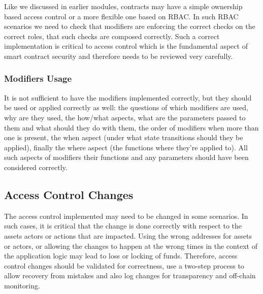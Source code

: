 Like we discussed in earlier modules, contracts may have a simple
ownership based access control or a more flexible one based on RBAC. In
such RBAC scenarios we need to check that modifiers are enforcing the
correct checks on the correct roles, that such checks are composed
correctly. Such a correct implementation is critical to access control
which is the fundamental aspect of smart contract security and therefore
needs to be reviewed very carefully.

\subsubsection{Modifiers Usage}\label{modifiers-usage}

It is not sufficient to have the modifiers implemented correctly, but
they should be used or applied correctly as well: the questions of which
modifiers are used, why are they used, the how/what aspects, what are
the parameters passed to them and what should they do with them, the
order of modifiers when more than one is present, the when aspect (under
what state transitions should they be applied), finally the where aspect
(the functions where they're applied to). All such aspects of modifiers
their functions and any parameters should have been considered
correctly.

\subsection{Access Control Changes}\label{access-control-changes}

The access control implemented may need to be changed in some scenarios.
In such cases, it is critical that the change is done correctly with
respect to the assets actors or actions that are impacted. Using the
wrong addresses for assets or actors, or allowing the changes to happen
at the wrong times in the context of the application logic may lead to
loss or locking of funds. Therefore, access control changes should be
validated for correctness, use a two-step process to allow recovery from
mistakes and also log changes for transparency and off-chain monitoring.
